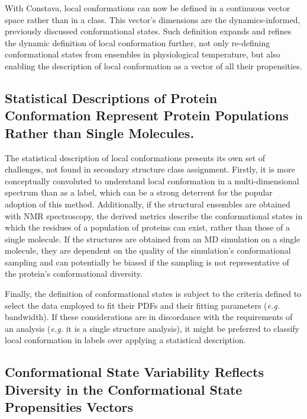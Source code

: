 With Constava, local conformations can now be defined in a continuous vector space rather than in a class. This vector's dimensions are the \gls{dynamics}-informed, previously discussed conformational states.
Such definition expands and refines the dynamic definition of local conformation further, not only re-defining conformational states from ensembles in physiological temperature, but also enabling the description of local conformation as a vector of all their propensities. 


\subsection{Statistical Descriptions of Protein Conformation Represent Protein Populations Rather than Single Molecules.}

The statistical description of local conformations presents its own set of challenges, not found in secondary structure class assignment. Firstly, it is more conceptually convoluted to understand local conformation in a multi-dimensional spectrum than as a label, which can be a strong deterrent for the popular adoption of this method. Additionally, if the structural ensembles are obtained with NMR spectroscopy, the derived metrics describe the conformational states in which the residues of a population of proteins can exist, rather than those of a single molecule. 
If the structures are obtained from an MD simulation on a single molecule, they are dependent on the quality of the simulation's conformational sampling and can potentially be biased if the sampling is not representative of the protein's conformational diversity.


Finally, the definition of conformational states is subject to the criteria defined to select the data employed to fit their PDFs and their fitting parameters (\textit{e.g.} bandwidth). If these considerations are in discordance with the requirements of an analysis (\textit{e.g.} it is a single structure analysis), it might be preferred to classify local conformation in labels over applying a statistical description. 


\subsection{Conformational State Variability Reflects Diversity in the Conformational State Propensities Vectors}


